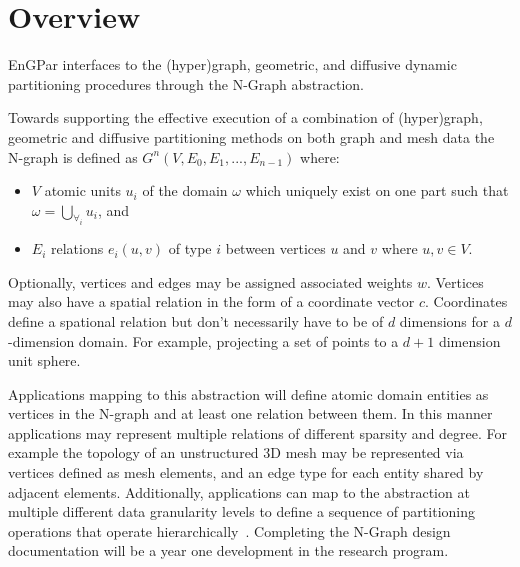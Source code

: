 \documentclass[12pt]{article}
\begin{document}
\maketitle

\section{Overview} \label{overview}
EnGPar interfaces to the (hyper)graph, geometric, and diffusive dynamic
partitioning procedures through the N-Graph abstraction.  

Towards supporting the effective execution of a combination of (hyper)graph,
geometric and diffusive partitioning methods on both graph and mesh data the
N-graph is defined as $G^n(V,E_0,E_1,...,E_{n-1})$ where:
\begin{itemize}
  \item $V$ atomic units $u_i$ of the domain $\omega$ which uniquely exist on one
    part such that $\omega = \bigcup_{\forall_i}u_i$, and 
  \item $E_i$ relations $e_i(u,v)$ of type $i$ between vertices $u$ and $v$
    where $u,v \in V$.
\end{itemize}
Optionally, vertices and edges may be assigned associated weights $w$.  
Vertices may also have a spatial relation in the form of a coordinate vector $c$.
Coordinates define a spational relation but don't necessarily have to be of $d$
dimensions for a $d$-dimension domain.
For example, projecting a set of points to a $d+1$ dimension unit
sphere\cite{gilbertGeo,kirmani2013scalable}.

Applications mapping to this abstraction will define atomic domain entities as
vertices in the N-graph and at least one relation between them.
In this manner applications may represent multiple relations of different
sparsity and degree.
For example the topology of an unstructured 3D mesh may be represented via
vertices defined as mesh elements, and an edge type for each entity shared by
adjacent elements.
Additionally, applications can map to the abstraction at multiple different data
granularity levels to define a sequence of partitioning operations that operate
hierarchically~\cite{turka2012code}.
Completing the N-Graph design documentation will be a year one development in
the research program.
\end{document}
